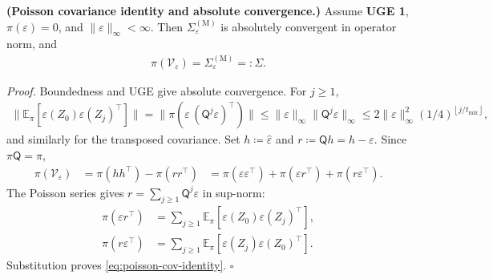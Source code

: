 \begin{lemma}\label{lem:poisson-covariance-identity}
  \textbf{(Poisson covariance identity and absolute convergence.)}
  Assume \textbf{UGE 1}, \(\pi(\varepsilon) = 0\), and
  \(\lVert \varepsilon \rVert_\infty < \infty\). Then \(\Sigma_{\varepsilon}^{(\text{M})}\) is absolutely convergent in operator
  norm, and
\begin{equation}
\begin{aligned}
\pi(\mathcal{V}_{\varepsilon}) = \Sigma_{\varepsilon}^{(\text{M})} =: \Sigma.
\end{aligned}
\label{eq:poisson-cov-identity}
\end{equation}
\end{lemma}

\textit{Proof.} Boundedness and UGE give absolute convergence. For \(j \ge 1\),
\begin{equation}
\begin{aligned}
\lVert \mathbb{E}_\pi [\varepsilon(Z_0) \varepsilon(Z_j)^\top] \rVert
  = \lVert \pi(\varepsilon \, (\mathsf{Q}^j \varepsilon)^\top) \rVert
  \le \lVert \varepsilon \rVert_\infty \lVert \mathsf{Q}^j \varepsilon \rVert_\infty
  \le 2 \lVert \varepsilon \rVert_\infty^2 (1 / 4)^{\left\lfloor j / t_{\text{mix}} \right\rfloor},
\end{aligned}
\label{eq:SigmaM-abs-one-sided}
\end{equation}
and similarly for the transposed covariance. Set \(h \coloneqq \widehat{\varepsilon}\) and \(r \coloneqq \mathsf{Q} h = h - \varepsilon\). Since
\(\pi \mathsf{Q} = \pi\),
\begin{equation}
\begin{aligned}
\pi(\mathcal{V}_{\varepsilon})
  &= \pi(h h^\top) - \pi(r r^\top)
  &= \pi(\varepsilon \varepsilon^\top)
     + \pi(\varepsilon r^\top) + \pi(r \varepsilon^\top).
\end{aligned}
\end{equation}
The Poisson series gives \(r = \sum_{j \ge 1} \mathsf{Q}^j \varepsilon\) in sup-norm:
\begin{equation}
\begin{aligned}
\pi(\varepsilon r^\top)
  &= \sum_{j \ge 1}
     \mathbb{E}_\pi [\varepsilon(Z_0) \varepsilon(Z_j)^\top], \\
\pi(r \varepsilon^\top)
  &= \sum_{j \ge 1}
     \mathbb{E}_\pi [\varepsilon(Z_j) \varepsilon(Z_0)^\top].
\end{aligned}
\end{equation}
Substitution proves \eqref{eq:poisson-cov-identity}. \(\square\)

